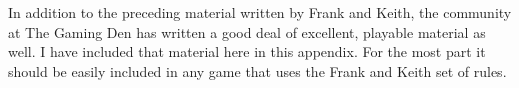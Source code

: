\vspace*{-8pt}

In addition to the preceding material written by Frank and Keith, the community at The Gaming Den has written a good deal of excellent, playable material as well. I have included that material here in this appendix. For the most part it should be easily included in any game that uses the Frank and Keith set of rules.
